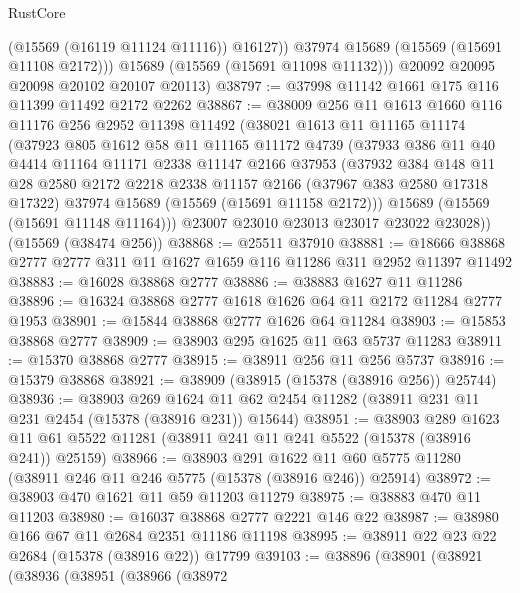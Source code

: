 \begin{lexlean}{RustCore}
\begin{coremodule}
              (@15569 (@16119 @11124 @11116))
              @16127))
          @37974
          @15689
          (@15569 (@15691 @11108 @2172)))
        @15689
        (@15569 (@15691 @11098 @11132)))
      @20092
      @20095
      @20098
      @20102
      @20107
      @20113)
@38797 := @37998 @11142 @1661 @175 @116 @11399 @11492 @2172 @2262
@38867 := @38009
    @256
    @11
    @1613
    @1660
    @116
    @11176
    @256
    @2952
    @11398
    @11492
    (@38021
      @1613
      @11
      @11165
      @11174
      (@37923
        @805
        @1612
        @58
        @11
        @11165
        @11172
        @4739
        (@37933
          @386
          @11
          @40
          @4414
          @11164
          @11171
          @2338
          @11147
          @2166
          @37953
          (@37932
            @384
            @148
            @11
            @28
            @2580
            @2172
            @2218
            @2338
            @11157
            @2166
            (@37967 @383 @2580 @17318 @17322)
            @37974
            @15689
            (@15569 (@15691 @11158 @2172)))
          @15689
          (@15569 (@15691 @11148 @11164)))
        @23007
        @23010
        @23013
        @23017
        @23022
        @23028))
    (@15569 (@38474 @256))
@38868 := @25511 @37910
@38881 := @18666 @38868 @2777 @2777 @311 @11 @1627 @1659 @116 @11286 @311 @2952 @11397 @11492
@38883 := @16028 @38868 @2777
@38886 := @38883 @1627 @11 @11286
@38896 := @16324 @38868 @2777 @1618 @1626 @64 @11 @2172 @11284 @2777 @1953
@38901 := @15844 @38868 @2777 @1626 @64 @11284
@38903 := @15853 @38868 @2777
@38909 := @38903 @295 @1625 @11 @63 @5737 @11283
@38911 := @15370 @38868 @2777
@38915 := @38911 @256 @11 @256 @5737
@38916 := @15379 @38868
@38921 := @38909 (@38915 (@15378 (@38916 @256)) @25744)
@38936 := @38903
    @269
    @1624
    @11
    @62
    @2454
    @11282
    (@38911 @231 @11 @231 @2454 (@15378 (@38916 @231)) @15644)
@38951 := @38903
    @289
    @1623
    @11
    @61
    @5522
    @11281
    (@38911 @241 @11 @241 @5522 (@15378 (@38916 @241)) @25159)
@38966 := @38903
    @291
    @1622
    @11
    @60
    @5775
    @11280
    (@38911 @246 @11 @246 @5775 (@15378 (@38916 @246)) @25914)
@38972 := @38903 @470 @1621 @11 @59 @11203 @11279
@38975 := @38883 @470 @11 @11203
@38980 := @16037 @38868 @2777 @2221 @146 @22
@38987 := @38980 @166 @67 @11 @2684 @2351 @11186 @11198
@38995 := @38911 @22 @23 @22 @2684 (@15378 (@38916 @22)) @17799
@39103 := @38896
    (@38901
      (@38921
        (@38936
          (@38951
            (@38966
              (@38972

\end{coremodule}
\end{lexlean}
